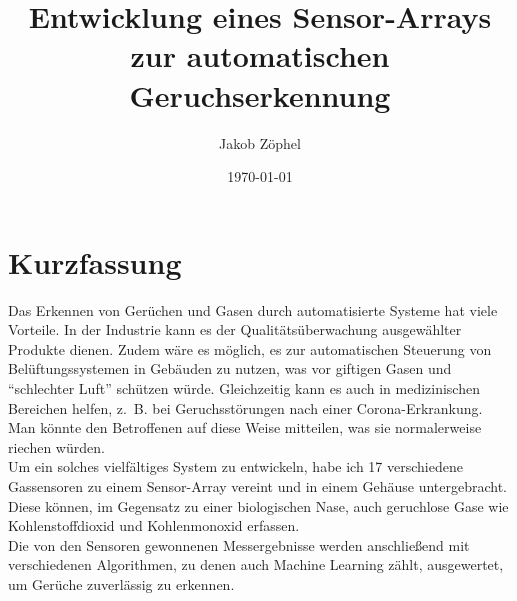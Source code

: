\documentclass[10pt]{article}
\title{
{Entwicklung eines Sensor-Arrays zur automatischen Geruchserkennung}\\
}
\author{Jakob Zöphel}
\date{\today}
\begin{document}
%

\maketitle

\thispagestyle{empty}
\newpage
{}

 
\section*{Kurzfassung} 
Das Erkennen von Gerüchen und Gasen durch automatisierte Systeme hat viele Vorteile. In der Industrie kann es der Qualitätsüberwachung
ausgewählter Produkte dienen. Zudem wäre es möglich, es zur automatischen Steuerung von Belüftungssystemen in Gebäuden zu nutzen, was vor giftigen Gasen und 
"`schlechter Luft"' schützen würde. Gleichzeitig kann es auch in medizinischen Bereichen helfen, z. B. bei Geruchsstörungen nach einer Corona-Erkrankung. 
Man könnte den Betroffenen auf diese Weise mitteilen, was sie normalerweise riechen würden.\\
Um ein solches vielfältiges System zu entwickeln, habe ich 17 verschiedene Gassensoren zu einem Sensor-Array vereint und in einem Gehäuse untergebracht. Diese können, 
im Gegensatz zu einer biologischen Nase, auch geruchlose Gase wie Kohlenstoffdioxid und Kohlenmonoxid erfassen.\\
Die von den Sensoren gewonnenen Messergebnisse werden anschließend mit verschiedenen Algorithmen, zu denen auch Machine Learning zählt,
ausgewertet, um Gerüche zuverlässig zu erkennen.

\newpage
\tableofcontents
\newpage


\listoffigures

{}
\listoftables
\newpage
\end{document}

